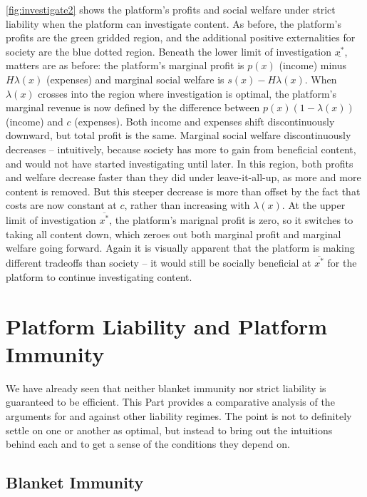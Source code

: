 \autoref{fig:investigate2} shows the platform's profits and social welfare under strict liability when the platform can investigate content. As before, the platform's profits are the green gridded region, and the additional positive externalities for society are the blue dotted region. Beneath the lower limit of investigation $\underline{x^*}$, matters are as before: the platform's marginal profit is $p(x)$ (income) minus $H\lambda(x)$ (expenses) and marginal social welfare is $s(x) - H\lambda(x)$. When $\lambda(x)$ crosses into the region where investigation is optimal, the platform's marginal revenue is now defined by the difference between $p(x)(1 - \lambda(x))$ (income) and $c$ (expenses). Both income and expenses shift discontinuously downward, but total profit is the same. Marginal social welfare discontinuously decreases -- intuitively, because society has more to gain from beneficial content, and would not have started investigating until later. In this region, both profits and welfare decrease faster than they did under leave-it-all-up, as more and more content is removed. But this steeper decrease is more than offset by the fact that costs are now constant at $c$, rather than increasing with $\lambda(x)$. At the upper limit of investigation $\overline{x^*}$, the platform's marignal profit is zero, so it switches to taking all content down, which zeroes out both marginal profit and marginal welfare going forward. Again it is visually apparent that the platform is making different tradeoffs than society -- it would still be socially beneficial at $\overline{x^*}$ for the platform to continue investigating content.




\section{Platform Liability and Platform Immunity}
\label{sec:liability}

We have already seen that neither blanket immunity nor strict liability is guaranteed to be efficient. This Part provides a comparative analysis of the arguments for and against other liability regimes. The point is not to definitely settle on one or another as optimal, but instead to bring out the intuitions behind each and to get a sense of the conditions they depend on.



\subsection{Blanket Immunity}

